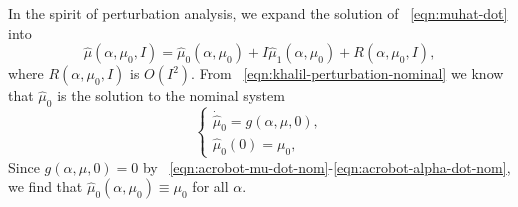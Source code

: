 In the spirit of perturbation analysis, we expand the solution of
~\eqref{eqn:muhat-dot} into
\begin{equation}\label{eqn:acrobot-muhat-approx}
    \hat{\mu}(\alpha,\mu_0,I) = \hat{\mu}_0(\alpha,\mu_0) + I
    \hat{\mu}_1(\alpha,\mu_0)
    + R(\alpha,\mu_0,I)
    ,
\end{equation}
where \(R(\alpha,\mu_0,I)\) is \(O(I^2)\).
From ~\eqref{eqn:khalil-perturbation-nominal} we know that 
\(\hat{\mu}_0\) is the solution to the nominal system
\[
\begin{cases}
    \dot{\hat{\mu}}_0 = g(\alpha,\mu,0)
    , \\
    \hat{\mu}_0(0) = \mu_0
    ,
\end{cases}
\]
Since \(g(\alpha,\mu,0) = 0\) by 
~\eqref{eqn:acrobot-mu-dot-nom}-\eqref{eqn:acrobot-alpha-dot-nom}, we find that
\(\hat{\mu}_0(\alpha,\mu_0) \equiv \mu_0\) for all \(\alpha\).

